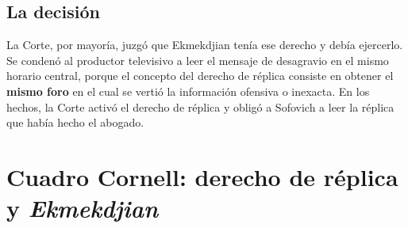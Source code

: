 \documentclass[12pt,oneside]{book}
\begin{document}
\subsection{La decisión}

La Corte, por mayoría, juzgó que Ekmekdjian tenía ese derecho y debía ejercerlo. Se condenó al productor televisivo a leer el mensaje de desagravio en el mismo horario central, porque el concepto del derecho de réplica consiste en obtener el \textbf{mismo foro} en el cual se vertió la información ofensiva o inexacta. En los hechos, la Corte activó el derecho de réplica y obligó a Sofovich a leer la réplica que había hecho el abogado.

\section{Cuadro Cornell: derecho de réplica y \textit{Ekmekdjian}}
\end{document}
